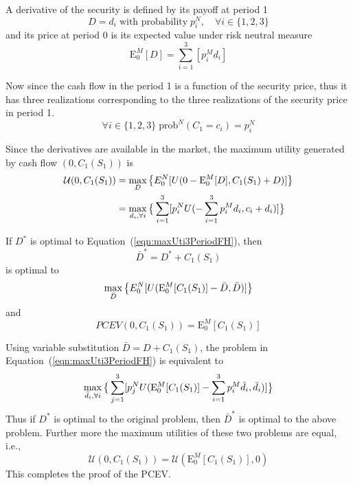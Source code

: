 \documentclass{article}[12pt letter]
\newcommand{\E}{\mathrm{E}}
\begin{document}
 A derivative of the security is defined by its payoff at period 1
 \[D =d_i \; \text{with probability} \; p_i^N, \quad \forall i\in\{1,2,3\}\]
 and its price at period 0 is its expected value under risk neutral measure
 \[\E_0^M[D] = \sum_{i=1}^3[p_i^M d_i] \]
 
 
 Now since the cash flow in the period 1 is a function of the security price, thus it has three realizations corresponding to the three realizations of the security price in period 1. 
 \[ \forall i \in \{1, 2, 3\} \; \text{prob}^N(C_1 = c_i) = p_i^N \]
 
 
Since the derivatives are available in the market, the maximum utility generated by cash flow $(0,C_1(S_1))$ is
\begin{align}
\mathcal{U}(0,C_1(S_1))&= \max_{D}\big{\{} E_0^N [U(0-\E_0^M[D], C_1(S_1) + D)]\big{ \}}\nonumber \\
& = \max_{d_i, \forall i} \big{\{}\sum_{i=1}^3 [p_i^N U(-\sum_{i=1}^3 p_i^M d_i, c_i + d_i)]\big{ \}} \label{eqn:maxUti3PeriodFH}
\end{align}

{\lemma If $D^*$ is optimal to Equation~(\ref{eqn:maxUti3PeriodFH}), then
\[\bar{D}^* = D^* + C_1(S_1) \] 
is optimal to 
\[ \max_{\bar{D}} \big{\{} E_0^N [U(\E_0^M[C_1(S_1)]-\bar{D},  \bar{D} )]\big{ \}} \]
and
\[PCEV(0, C_1(S_1)) = \E_0^M[C_1(S_1)]\]
} 

\proof Using variable substitution $\bar{D} = D + C_1(S_1)$, the problem in Equation~(\ref{eqn:maxUti3PeriodFH}) is equivalent to
\[\max_{\bar{d}_i, \forall i} \big{\{}\sum_{j=1}^3 [p_j^N U(\E_0^M[C_1(S_1)]-\sum_{i=1}^3 p_i^M \bar{d}_i, \bar{d}_i)]\big{ \}} \]
Thus if $D^*$ is optimal to the original problem, then $\bar{D}^*$ is optimal to the above problem. Further more the maximum utilities of these two problems are equal, i.e.,
\[\mathcal{U}(0, C_1(S_1)) = \mathcal{U} (\E_0^M[C_1(S_1)],0) \]
This completes the proof of the PCEV. 
\endproof

%

%






\newpage

%
\end{document}
